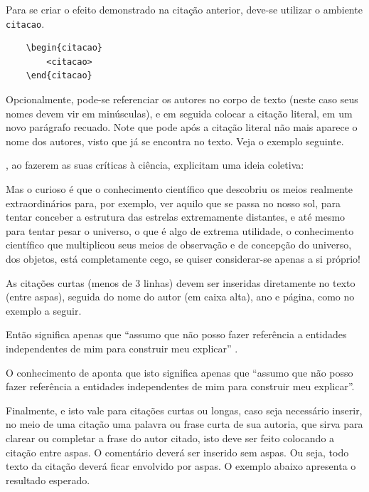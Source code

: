 Para se criar o efeito demonstrado na citação anterior, deve-se utilizar o ambiente \texttt{citacao}.
\begin{verbatim}
    \begin{citacao}
        <citacao>
    \end{citacao}
\end{verbatim}

Opcionalmente, pode-se referenciar os autores no corpo de texto (neste caso seus nomes devem vir em minúsculas), e em seguida colocar a citação literal, em um novo parágrafo recuado.
Note que pode após a citação literal não mais aparece o nome dos autores, visto que já se encontra no texto.
Veja o exemplo seguinte.

, ao fazerem as suas críticas à ciência, explicitam uma ideia coletiva:

\begin{citacao}
Mas o curioso é que o conhecimento científico que descobriu os meios realmente extraordinários para, por exemplo, ver aquilo que se passa no nosso sol, para tentar conceber a estrutura das estrelas extremamente distantes, e até mesmo para tentar pesar o universo, o que é algo de extrema utilidade, o conhecimento científico que multiplicou seus meios de observação e de concepção do universo, dos objetos, está completamente cego, se quiser considerar-se apenas a si próprio!
\end{citacao}

As citações curtas (menos de 3 linhas) devem ser inseridas diretamente no texto (entre aspas), seguida do nome do autor (em caixa alta), ano e página, como no exemplo a seguir.

Então significa apenas que ``assumo que não posso fazer referência a entidades independentes de mim para construir meu explicar'' \cite[p.~35]{maturana:2003}.

O conhecimento de  aponta que isto significa apenas que ``assumo que não posso fazer referência a entidades independentes de mim para construir meu explicar''.

Finalmente, e isto vale para citações curtas ou longas, caso seja necessário inserir, no meio de uma citação uma palavra ou frase curta de sua autoria, que sirva para clarear ou completar a frase do autor citado, isto deve ser feito colocando a citação entre aspas.
O comentário deverá ser inserido sem aspas.
Ou seja, todo texto da citação deverá ficar envolvido por aspas.
O exemplo abaixo apresenta o resultado esperado.

